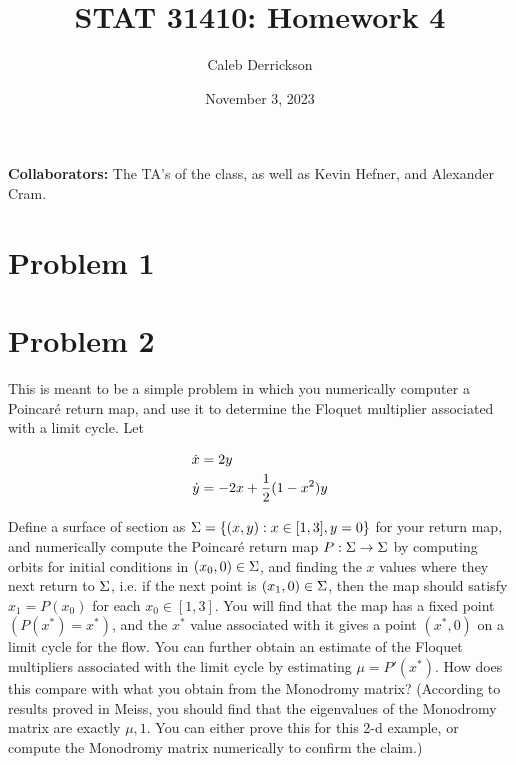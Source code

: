 

\title{STAT 31410: Homework 4}
\author{Caleb Derrickson}
\date{November 3, 2023}


\onehalfspacing
\maketitle

{\color{cit}\vspace{2mm}\noindent\textbf{Collaborators:}} The TA's of the class, as well as Kevin Hefner, and Alexander Cram.

\tableofcontents

\newpage
\section{Problem 1}

\newpage
\section{Problem 2}
This is meant to be a simple problem in which you numerically computer a Poincar\'e return map, and use it to determine the Floquet multiplier associated with a limit cycle. Let

\begin{align}
    \dot{x} &= 2y\nonumber\\
    \dot{y} &= -2x + \frac{1}{2}(1 - x^2)y\nonumber
\end{align}

Define a surface of section as $\Sigma = \{(x, y) : x \in [1, 3], y = 0\}$ for your return map, and numerically compute the Poincar\'e return map $P: \Sigma \rightarrow \Sigma $ by computing orbits for initial conditions in $(x_0, 0) \in \Sigma$, and finding the $x$ values where they next return to $\Sigma$, i.e. if the next point is $(x_1, 0) \in \Sigma$, then the map should satisfy $x_1 = P(x_0)$ for each $x_0 \in [1, 3]$. You will find that the map has a fixed point $(P(x^*) = x^*)$, and the $x^*$ value associated with it gives a point $(x^*, 0)$ on a limit cycle for the flow. You can further obtain an estimate of the Floquet multipliers associated with the limit cycle by estimating $\mu = P'(x^*)$. How does this compare with what you obtain from the Monodromy matrix? (According to results proved in Meiss, you should find that the eigenvalues of the Monodromy matrix are exactly $\mu, 1$. You can either prove this for this 2-d example, or compute the Monodromy matrix numerically to confirm the claim.)
